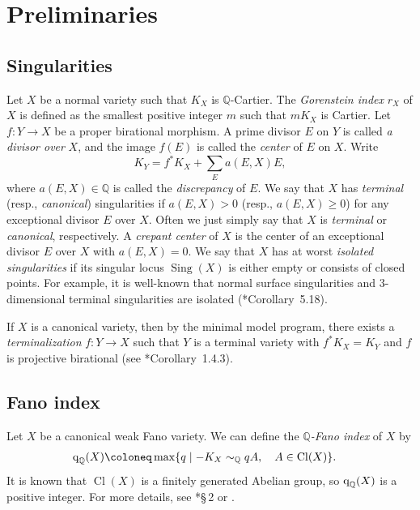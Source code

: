 \documentclass[12pt,twoside]{amsart}
\DeclareMathOperator{\Sing}{Sing}
\DeclareMathOperator{\Cl}{Cl}
\newcommand{\qW}{\text{\rm q}_{\text{\rm W}}}
\newcommand{\qQ}{\text{\rm q}_{\mathbb{Q}}}
\theoremstyle{definition}
\begin{document}
\section{Preliminaries}

 
\subsection{Singularities}

Let $X$ be a normal variety such that $K_X$ is $\mathbb Q$-Cartier. The \emph{Gorenstein index} $r_X$ of $X$ is defined as the smallest positive integer $m$ such that $mK_X$ is Cartier. Let $f\colon Y\to X$ be a proper birational morphism. A prime divisor $E$ on $Y$ is called \emph{a divisor over} $X$, and the image $f(E)$ is called the \emph{center} of $E$ on $X$. 
Write
\[
    K_Y=f^*K_X+\sum_Ea(E,X)E,
\]
where $a(E,X)\in \mathbb Q$ is called the \emph{discrepancy} of $E$. We say that $X$ has \emph{terminal} (resp., \emph{canonical}) singularities if $a(E,X)>0$ (resp., $a(E,X)\geq 0$) for any exceptional divisor $E$ over $X$. Often we just simply say that $X$ is {\it terminal} or {\it canonical}, respectively. A \emph{crepant center} of $X$ is the center of an exceptional divisor $E$ over $X$ with $a(E,X)=0$. We say that $X$ has at worst {\it isolated singularities} if its singular locus $\Sing(X)$ is either empty or consists of closed points. For example, it is well-known that normal surface singularities and $3$-dimensional terminal singularities are isolated (\cite{kollar-mori}*{Corollary~5.18}).

If $X$ is a canonical variety, then by the minimal model program, there exists a \emph{terminalization} $f\colon Y\to X$ such that $Y$ is a terminal variety with $f^*K_X=K_Y$ and $f$ is projective birational (see \cite{BCHM}*{Corollary~1.4.3}).

\subsection{Fano index}\label{subsec.fi}

Let $X$ be a canonical weak Fano variety. We can define the \emph{$\mathbb Q$-Fano index} of $X$ by 
\begin{align*} 
    \qQ(X) {}&\coloneq \max\{q \mid -K_X \sim_{\mathbb Q}qA, \quad A\in \Cl (X) \}. 
\end{align*}
It is known that $\Cl (X)$ is a finitely generated Abelian group, so $\qQ(X)$ is a positive integer. For more details, see \cite{ip}*{\S\,2} or \cite{prokhorov2010}.
\end{document}
